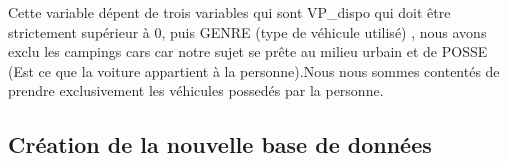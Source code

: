 \documentclass[
]{article}
\newenvironment{Shaded}{\begin{snugshade}}{\end{snugshade}}
\newcommand{\AttributeTok}[1]{\textcolor[rgb]{0.13,0.29,0.53}{#1}}
\newcommand{\DecValTok}[1]{\textcolor[rgb]{0.00,0.00,0.81}{#1}}
\newcommand{\FunctionTok}[1]{\textcolor[rgb]{0.13,0.29,0.53}{\textbf{#1}}}
\newcommand{\NormalTok}[1]{#1}
\newcommand{\OtherTok}[1]{\textcolor[rgb]{0.56,0.35,0.01}{#1}}
\newcommand{\SpecialCharTok}[1]{\textcolor[rgb]{0.81,0.36,0.00}{\textbf{#1}}}
\newcommand{\StringTok}[1]{\textcolor[rgb]{0.31,0.60,0.02}{#1}}
\begin{document}
\begin{Shaded}
\end{Shaded}

Cette variable dépent de trois variables qui sont VP\_dispo qui doit
être strictement supérieur à 0, puis GENRE (type de véhicule utilisé) ,
nous avons exclu les campings cars car notre sujet se prête au milieu
urbain et de POSSE (Est ce que la voiture appartient à la personne).Nous
nous sommes contentés de prendre exclusivement les véhicules possedés
par la personne.\newline 

\hypertarget{cruxe9ation-de-la-nouvelle-base-de-donnuxe9es}{%
\subsection{Création de la nouvelle base de
données}\label{cruxe9ation-de-la-nouvelle-base-de-donnuxe9es}}
\end{document}
